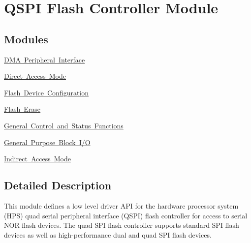 \hypertarget{group__ALT__QSPI}{}\section{Q\+S\+PI Flash Controller Module}
\label{group__ALT__QSPI}
\subsection*{Modules}
\begin{DoxyCompactItemize}
\item 
\mbox{\hyperlink{group__ALT__QSPI__DMA}{D\+M\+A Peripheral Interface}}
\item 
\mbox{\hyperlink{group__ALT__QSPI__DAC}{Direct Access Mode}}
\item 
\mbox{\hyperlink{group__ALT__QSPI__DEV__CFG}{Flash Device Configuration}}
\item 
\mbox{\hyperlink{group__ALT__QSPI__ERASE}{Flash Erase}}
\item 
\mbox{\hyperlink{group__ALT__QSPI__CSR}{General Control and Status Functions}}
\item 
\mbox{\hyperlink{group__ALT__QSPI__GP__BLKIO}{General Purpose Block I/O}}
\item 
\mbox{\hyperlink{group__ALT__QSPI__INDAC}{Indirect Access Mode}}
\end{DoxyCompactItemize}


\subsection{Detailed Description}
This module defines a low level driver A\+PI for the hardware processor system (H\+PS) quad serial peripheral interface (Q\+S\+PI) flash controller for access to serial N\+OR flash devices. The quad S\+PI flash controller supports standard S\+PI flash devices as well as high-\/performance dual and quad S\+PI flash devices. 